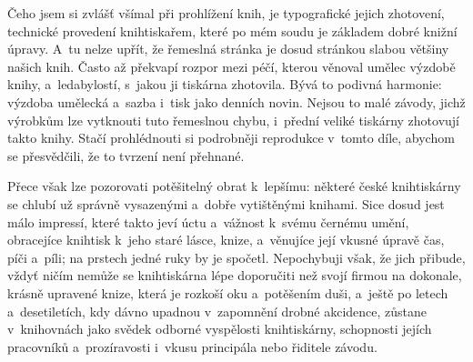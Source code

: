 Čeho jsem si zvlášť všímal při prohlížení knih, je typografické jejich
zhotovení, technické provedení knihtiskařem, které po mém soudu je základem
dobré knižní úpravy. A~tu nelze upřít, že řemeslná stránka je dosud stránkou
slabou většiny našich knih. Často až překvapí rozpor mezi péčí, kterou
věnoval umělec výzdobě knihy, a~ledabylostí, s~jakou ji tiskárna zhotovila.
Bývá to podivná harmonie: výzdoba umělecká a~sazba i~tisk jako denních
novin. Nejsou to malé závody, jichž výrobkům lze vytknouti tuto řemeslnou
chybu, i~přední veliké tiskárny zhotovují takto  knihy. 
Stačí prohlédnouti si podrobněji reprodukce v~tomto díle, abychom se
přesvědčili, že to tvrzení není přehnané.

Přece však lze pozorovati potěšitelný obrat k~lepšímu: některé české
knihtiskárny se chlubí už správně vysazenými a~dobře vytištěnými knihami.
Sice dosud jest málo impressí, které takto jeví úctu a~vážnost k~svému
černému umění, obracejíce knihtisk k~jeho staré lásce, knize, a~věnujíce
její vkusné úpravě čas, píči a~píli; na prstech jedné ruky by je spočetl.
Nepochybuji však, že jich přibude, vždyť ničím nemůže se knihtiskárna
lépe doporučiti než svojí firmou na dokonale, krásně upravené knize, která
je rozkoší oku a~potěšením duši, a~ještě po letech a~desetiletích, kdy
dávno upadnou v~zapomnění drobné akcidence, zůstane v~knihovnách jako svědek
odborné vyspělosti knihtiskárny, schopnosti jejích pracovníků
a~prozíravosti i~vkusu principála nebo řiditele závodu.
